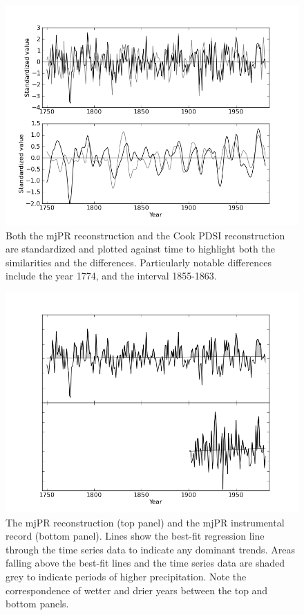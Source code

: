\begin{figure}
\centering
\includegraphics[width=5in]{figures/reconCompare.png}
\caption{Both the mjPR reconstruction and the Cook PDSI reconstruction are standardized and plotted against time to highlight both the similarities and the differences. Particularly notable differences include the year 1774, and the interval 1855-1863.}
\label{fig:reconCompare}
\end{figure}

\begin{figure}
\centering
\includegraphics[width=5in]{figures/wetdry.png}
\caption{The mjPR reconstruction (top panel) and the mjPR instrumental record (bottom panel). Lines show the best-fit regression line through the time series data to indicate any dominant trends. Areas falling above the best-fit lines and the time series data are shaded grey to indicate periods of higher precipitation. Note the correspondence of wetter and drier years between the top and bottom panels.}
\label{fig:wetdry}
\end{figure}

